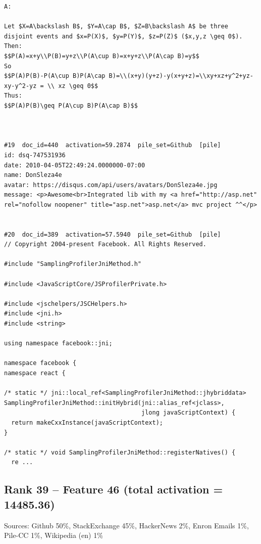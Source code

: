 \begin{verbatim}
A:

Let $X=A\backslash B$, $Y=A\cap B$, $Z=B\backslash A$ be three disjoint events and $x=P(X)$, $y=P(Y)$, $z=P(Z)$ ($x,y,z \geq 0$). 
Then:
$$P(A)=x+y\\P(B)=y+z\\P(A\cup B)=x+y+z\\P(A\cap B)=y$$
So
$$P(A)P(B)-P(A\cup B)P(A\cap B)=\\(x+y)(y+z)-y(x+y+z)=\\xy+xz+y^2+yz-xy-y^2-yz = \\ xz \geq 0$$
Thus:
$$P(A)P(B)\geq P(A\cup B)P(A\cap B)$$



#19  doc_id=440  activation=59.2874  pile_set=Github  [pile]
id: dsq-747531936
date: 2010-04-05T22:49:24.0000000-07:00
name: DonSleza4e
avatar: https://disqus.com/api/users/avatars/DonSleza4e.jpg
message: <p>Awesome<br>Integrated lib with my <a href="http://asp.net" rel="nofollow noopener" title="asp.net">asp.net</a> mvc project ^^</p>


#20  doc_id=389  activation=57.5940  pile_set=Github  [pile]
// Copyright 2004-present Facebook. All Rights Reserved.

#include "SamplingProfilerJniMethod.h"

#include <JavaScriptCore/JSProfilerPrivate.h>

#include <jschelpers/JSCHelpers.h>
#include <jni.h>
#include <string>

using namespace facebook::jni;

namespace facebook {
namespace react {

/* static */ jni::local_ref<SamplingProfilerJniMethod::jhybriddata>
SamplingProfilerJniMethod::initHybrid(jni::alias_ref<jclass>,
                                      jlong javaScriptContext) {
  return makeCxxInstance(javaScriptContext);
}

/* static */ void SamplingProfilerJniMethod::registerNatives() {
  re ...

\end{verbatim}

\subsection*{Rank 39 -- Feature 46 (total activation = 14485.36)}

Sources: Github 50\%, StackExchange 45\%, HackerNews 2\%, Enron Emails 1\%, Pile-CC 1\%, Wikipedia (en) 1\%

